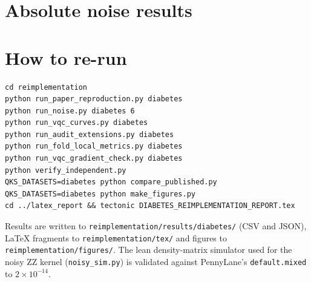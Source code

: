 \documentclass[11pt,a4paper]{article}
\newcommand{\code}[1]{\texttt{\small #1}}
\newcommand{\tabdir}{../reimplementation/tex/}
\begin{document}
\appendix
\section{Absolute noise results}
\label{app:noise}


\section{How to re-run}
\begin{verbatim}
cd reimplementation
python run_paper_reproduction.py diabetes
python run_noise.py diabetes 6
python run_vqc_curves.py diabetes
python run_audit_extensions.py diabetes
python run_fold_local_metrics.py diabetes
python run_vqc_gradient_check.py diabetes
python verify_independent.py
QKS_DATASETS=diabetes python compare_published.py
QKS_DATASETS=diabetes python make_figures.py
cd ../latex_report && tectonic DIABETES_REIMPLEMENTATION_REPORT.tex
\end{verbatim}
Results are written to \code{reimplementation/results/diabetes/} (CSV and JSON), LaTeX fragments to \code{reimplementation/tex/} and figures to \code{reimplementation/figures/}. The lean density-matrix simulator used for the noisy ZZ kernel (\code{noisy\_sim.py}) is validated against PennyLane's \code{default.mixed} to $2\times10^{-14}$.
\end{document}
